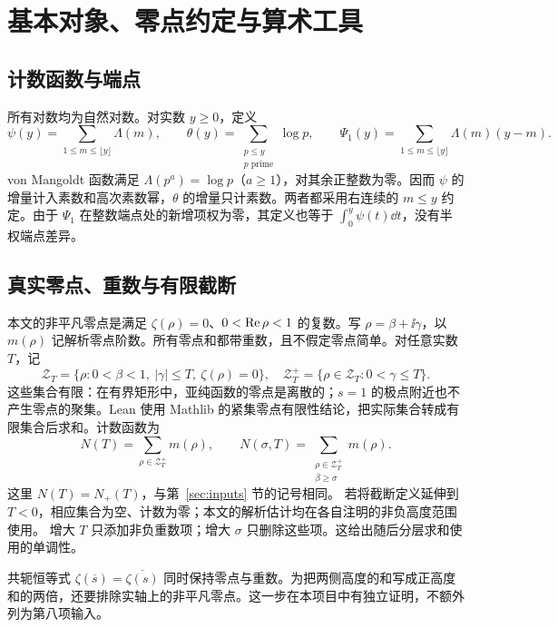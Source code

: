 \section{基本对象、零点约定与算术工具}\label{sec:preliminaries}

\subsection{计数函数与端点}
所有对数均为自然对数。对实数 $y\ge0$，定义
\[
\psi(y)=\sum_{1\le m\le\lfloor y\rfloor}\Lambda(m),\qquad
\theta(y)=\sum_{\substack{p\le y\\p\text{ prime}}}\log p,\qquad
\Psi_1(y)=\sum_{1\le m\le\lfloor y\rfloor}\Lambda(m)(y-m).
\]
von Mangoldt 函数满足 $\Lambda(p^a)=\log p$（$a\ge1$），对其余正整数为零。因而 $\psi$ 的增量计入素数和高次素数幂，$\theta$ 的增量只计素数。两者都采用右连续的 $m\le y$ 约定。由于 $\Psi_1$ 在整数端点处的新增项权为零，其定义也等于 $\int_0^y\psi(t)\dd t$，没有半权端点差异。

\subsection{真实零点、重数与有限截断}
本文的非平凡零点是满足 $\zeta(\rho)=0$、$0<\operatorname{Re}\rho<1$ 的复数。写 $\rho=\beta+\ii\gamma$，以 $m(\rho)$ 记解析零点阶数。所有零点和都带重数，且不假定零点简单。对任意实数 $T$，记
\[
\mathcal Z_T=\{\rho:0<\beta<1,\ |\gamma|\le T,\ \zeta(\rho)=0\},
\quad
\mathcal Z_T^+=\{\rho\in\mathcal Z_T:0<\gamma\le T\}.
\]
这些集合有限：在有界矩形中，亚纯函数的零点是离散的；$s=1$ 的极点附近也不产生零点的聚集。Lean 使用 Mathlib 的紧集零点有限性结论，把实际集合转成有限集合后求和。计数函数为
\[
N(T)=\sum_{\rho\in\mathcal Z_T^+}m(\rho),\qquad
N(\sigma,T)=\sum_{\substack{\rho\in\mathcal Z_T^+\\\beta\ge\sigma}}m(\rho).
\]
这里 $N(T)=N_+(T)$，与第~\ref{sec:inputs} 节的记号相同。
若将截断定义延伸到 $T<0$，相应集合为空、计数为零；本文的解析估计均在各自注明的非负高度范围使用。
增大 $T$ 只添加非负重数项；增大 $\sigma$ 只删除这些项。这给出随后分层求和使用的单调性。

共轭恒等式 $\zeta(\overline s)=\overline{\zeta(s)}$ 同时保持零点与重数。为把两侧高度的和写成正高度和的两倍，还要排除实轴上的非平凡零点。这一步在本项目中有独立证明，不额外列为第八项输入。

